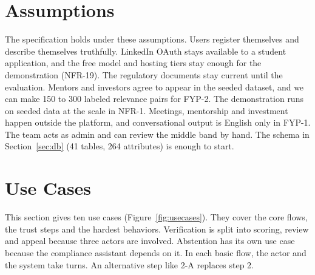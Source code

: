 \documentclass{FastFyp}
\begin{document}
\section{Assumptions}
The specification holds under these assumptions. Users register themselves and describe themselves truthfully. LinkedIn OAuth stays available to a student application, and the free model and hosting tiers stay enough for the demonstration (NFR-19). The regulatory documents stay current until the evaluation. Mentors and investors agree to appear in the seeded dataset, and we can make 150 to 300 labeled relevance pairs for FYP-2. The demonstration runs on seeded data at the scale in NFR-1. Meetings, mentorship and investment happen outside the platform, and conversational output is English only in FYP-1. The team acts as admin and can review the middle band by hand. The schema in Section~\ref{sec:db} (41 tables, 264 attributes) is enough to start.

\section{Use Cases}\label{sec:uc}
This section gives ten use cases (Figure~\ref{fig:usecases}). They cover the core flows, the trust steps and the hardest behaviors. Verification is split into scoring, review and appeal because three actors are involved. Abstention has its own use case because the compliance assistant depends on it. In each basic flow, the actor and the system take turns. An alternative step like 2-A replaces step 2.
\end{document}

